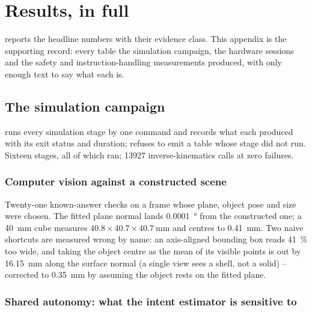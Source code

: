 \chapter{Results, in full}
\label{ch:results}

 reports the headline numbers with their evidence
class. This appendix is the supporting record: every table the simulation
campaign, the hardware sessions and the safety and instruction-handling
measurements produced, with only enough text to say what each is.

\section{The simulation campaign}
\label{sec:campaign}

 runs every simulation stage by
one command and records what each produced with its exit status and
duration;  refuses to emit a table whose
stage did not run. Sixteen stages, all of which ran; \num{13927}
inverse-kinematics calls at zero failures.

\begin{table}[htbp]
  \centering
  \small
  \caption{The simulation campaign inventory.}
  \label{tab:campaign}
  
\end{table}

\subsection{Computer vision against a constructed scene}
\label{sec:sim-cv}

Twenty-one known-answer checks on a frame whose plane, object pose and size
were chosen. The fitted plane normal lands \SI{0.0001}{\degree} from the
constructed one; a \SI{40}{\milli\metre} cube measures $40.8 \times 40.7
\times \SI{40.7}{\milli\metre}$ and centres to \SI{0.41}{\milli\metre}. Two
naive shortcuts are measured wrong by name: an axis-aligned bounding box
reads \SI{41}{\percent} too wide, and taking the object centre as the mean
of its visible points is out by \SI{16.15}{\milli\metre} along the surface
normal (a single view sees a shell, not a solid) -- corrected to
\SI{0.35}{\milli\metre} by assuming the object rests on the fitted plane.

\subsection{Shared autonomy: what the intent estimator is sensitive to}

